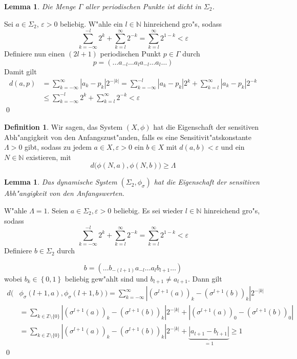 \documentclass[a4paper, 13pt]{scrreprt}
\newtheorem{lemma}[theorem]{Lemma}
\theoremstyle{definition} \newtheorem{definition}{Definition}[section]
\newenvironment{beweis}[1][Beweis]{\begin{trivlist}
\item[\hskip \labelsep {\bfseries #1}]}{\end{trivlist}}
\begin{document}
\begin{lemma}
Die Menge $\Gamma$ aller periodischen Punkte ist dicht in $\Sigma_2$.
\end{lemma}
\begin{beweis}
Sei $a\in \Sigma_2$, $\varepsilon > 0$ beliebig. W"ahle ein $l\in\mathbb{N}$ hinreichend gro"s, sodass 
$$ \sum_{k = -\infty}^{-l}{2^{k}} + \sum_{k=l}^{\infty}{2^{-k}} = \sum_{k=l}^{\infty}2^{1-k}< \varepsilon$$ 
Definiere nun einen $(2l+1)$ periodischen Punkt $p \in \Gamma$ durch
$$ p = (\ldots a_{-l}\ldots a_{l} a_{-l} \ldots a_{l} \ldots )$$
Damit gilt
\begin{align*}
	d(a, p) &= \sum_{k = -\infty}^{\infty}{|a_k - p_k| 2^{-|k|}} = \sum_{k = -\infty}^{-l}{|a_k-p_k|2^{k}} + \sum_{k=l}^{\infty}{|a_k-p_k|2^{-k}}\\
	&\leq \sum_{k = -\infty}^{-l}{2^{k}} + \sum_{k=l}^{\infty}{2^{-k}} < \varepsilon
\end{align*}
\qed
\end{beweis}

\begin{definition}
Wir sagen, das System \((X,\phi)\) hat die Eigenschaft der sensitiven Abh"angigkeit von den Anfangszust"anden, falls es eine Sensitivit"atskonstante \(\Lambda > 0\) gibt, sodass zu jedem \(a \in X, \varepsilon >0\) ein \(b \in X\) mit \(d(a,b) < \varepsilon\) und ein \(N\in \mathbb{N}\) existieren, mit 
	\[d\bigl(\phi(N, a), \phi(N, b)\bigr) \geq \Lambda\]
\end{definition}

\begin{lemma}
Das dynamische System \((\Sigma_2,\phi_\sigma)\) hat die Eigenschaft der sensitiven Abh"angigkeit von den Anfangswerten.
\end{lemma}
\begin{beweis}
W"ahle \(\Lambda = 1\). Seien \(a\in\Sigma_2, \varepsilon > 0\) beliebig. Es sei wieder $l\in\mathbb{N}$ hinreichend gro"s, sodass 
$$ \sum_{k = -\infty}^{-l}{2^{k}} + \sum_{k=l}^{\infty}{2^{-k}} = \sum_{k=l}^{\infty}2^{1-k}< \varepsilon$$ 
Definiere $b \in \Sigma_2$ durch

$$ b = (\ldots b_{-(l+1)}a_{-l}\ldots a_{l} b_{l+1} \ldots) $$
wobei $b_k \in \left \{ 0,1 \right \}$ beliebig gew"ahlt sind und $b_{l+1} \neq a_{l+1}$. Dann gilt
\begin{align*}
d\bigl(&\phi_\sigma(l+1, a), \phi_\sigma(l+1, b)\bigr) = \sum_{k=-\infty}^{\infty}{\left|\left(\sigma^{l+1}(a)\right)_k - \left(\sigma^{l+1}(b)\right)_k\right|2^{-|k|}} \\
&= \sum_{k \in \mathbb{Z} \setminus \{0\}}{\left|\left(\sigma^{l+1}(a)\right)_k - \left(\sigma^{l+1}(b)\right)_k\right|2^{-|k|}} + \left|\left(\sigma^{l+1}(a)\right)_0 - \left(\sigma^{l+1}(b)\right)_0\right| \\
 &=\sum_{k \in \mathbb{Z} \setminus \{0\}}{\left|\left(\sigma^{l+1}(a)\right)_k - \left(\sigma^{l+1}(b)\right)_k\right|2^{-|k|}} + \underbrace{|a_{l+1} - b_{l+1}|}_{ = 1} \geq 1 
\end{align*}
\qed
\end{beweis}
\end{document}

